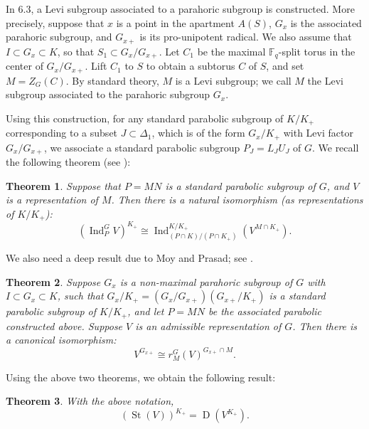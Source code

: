 \documentclass[12pt]{article}
\newtheorem{theorem}{Theorem}[section]
\theoremstyle{remark}
\begin{document}
In \cite{MoyPrasad1996} 6.3, a Levi subgroup associated to a parahoric subgroup is constructed. More precisely, suppose that $x$ is a point in the apartment $A(S)$, $G_x$ is the associated parahoric subgroup, and $G_{x+}$ is its pro-unipotent radical. We also assume that $I \subset G_x \subset K$, so that $S_1 \subset G_x/G_{x+}$. Let $C_1$ be the maximal $\mathbb{F}_q$-split torus in the center of $G_x/G_{x+}$. Lift $C_1$ to $S$ to obtain a subtorus $C$ of $S$, and set $M = Z_G(C)$. By standard theory, $M$ is a Levi subgroup; we call $M$ the Levi subgroup associated to the parahoric subgroup $G_x$.

Using this construction, for any standard parabolic subgroup of $K/K_+$ corresponding to a subset $J \subset \Delta_1$, which is of the form $G_x/K_+$ with Levi factor $G_x/G_{x+}$, we associate a standard parabolic subgroup $P_J = L_J U_J$ of $G$.
We recall the following theorem (see \cite[Theorem 1]{MishraRoesner2017}):
\begin{theorem}
 Suppose that $P = MN$ is a standard parabolic subgroup of $G$, and $V$ is a representation of $M$. Then there is a natural isomorphism (as representations of $K/K_+$):
$$
(\operatorname{Ind}_P^G V)^{K_+}  \cong \operatorname{Ind}_{(P \cap K)/(P \cap K_+)}^{K/K_+} (V^{M \cap K_+}).
$$
\end{theorem}
We also need a deep result due to Moy and Prasad; see \cite[Proposition 6.7]{MoyPrasad1996}.
\begin{theorem}
Suppose $G_x$ is a non-maximal parahoric subgroup of $G$ with $I \subset G_x \subset K$, such that $G_x/K_+ = (G_x/G_{x+})(G_{x+}/K_+)$ is a standard parabolic subgroup of $K/K_+$, and let $P=MN$ be the associated parabolic constructed above. Suppose $V$ is an admissible representation of $G$. Then there is a canonical isomorphism:
$$V^{G_{x+}} \cong r_{M}^{G}(V)^{G_{x+} \cap M}.$$
\end{theorem}
Using the above two theorems, we obtain the following result:
\begin{theorem}
 With the above notation,
$$(\operatorname{St}(V))^{K_+}= \operatorname{D}(V^{K_+}).$$
\end{theorem}
\end{document}
